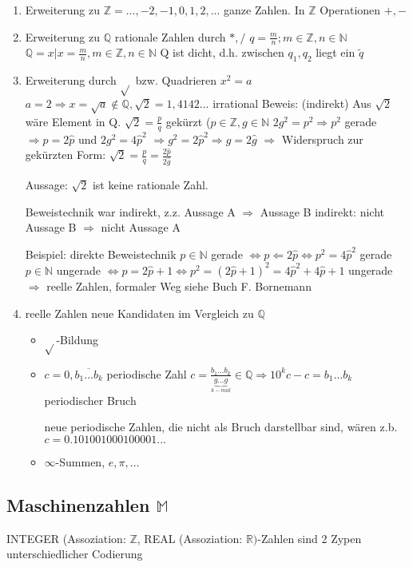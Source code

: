\documentclass[a4paper,10pt]{book}
\begin{document}
\begin{enumerate}
 \item Erweiterung zu $\mathbb{Z} = {...,-2,-1,0,1,2,...}$ ganze Zahlen. In $\mathbb{Z}$ Operationen $+,-$
 \item Erweiterung zu $\mathbb{Q}$ rationale Zahlen durch $*,/$ $q=\frac{m}{n}; m \in \mathbb{Z}, n \in \mathbb{N}$
$\mathbb{Q} = {x | x=\frac{m}{n}, m \in \mathbb{Z}, n \in \mathbb{N}}$
Q ist dicht, d.h. zwischen $q_1, q_2$ liegt ein $\tilde{q}$
 \item Erweiterung durch $\sqrt{}$ bzw. Quadrieren $x^2=a$
$a=2 \Rightarrow x = \sqrt{a} \notin \mathbb{Q}, \sqrt{2}=1,4142...$ irrational
Beweis: (indirekt)
Aus $\sqrt{2}$ wäre Element in Q. $\sqrt{2}=\frac{p}{q}$ gekürzt ($p \in \mathbb{Z}, g \in \mathbb{N}$
$2g^2=p^2 \Rightarrow p^2$ gerade $\Rightarrow p=2\hat{p}$ und $2g^2=4\hat{p}^2$
$\Rightarrow g^2 = 2\hat{p}^2 \Rightarrow g=2\hat{g}$ 
$\Rightarrow$ Widerspruch zur gekürzten Form: $\sqrt{2}=\frac{p}{q}=\frac{2\hat{p}}{2\hat{g}}$

Aussage: $\sqrt{2}$ ist keine rationale Zahl.

Beweistechnik war indirekt, z.z. Aussage A $\Rightarrow$ Aussage B
indirekt: nicht Aussage B $\Rightarrow$ nicht Aussage A

Beispiel: direkte Beweistechnik
$p \in \mathbb{N}$ gerade $\Leftrightarrow p \Leftarrow 2 \hat{p} \Leftrightarrow p^2 = 4\hat{p}^2$ gerade
$p \in \mathbb{N}$ ungerade $\Leftrightarrow p = 2 \hat{p}+1 \Leftrightarrow p^2 = (2\hat{p}+1)^2=4\hat{p}^2+4\hat{p}+1$ ungerade
$\Rightarrow$ reelle Zahlen, formaler Weg siehe Buch F. Bornemann

 \item reelle Zahlen
  neue Kandidaten im Vergleich zu $\mathbb{Q}$
\begin{itemize}
 \item $\sqrt{}$-Bildung
 \item $c = 0,\overline{b_1...b_k}$ periodische Zahl
$c = \frac{b_1...b_k}{\underbrace{g...g}_{k-mal}} \in \mathbb{Q} \Rightarrow 10^k c -c = b_1 \ldots b_k$ periodischer Bruch

neue periodische Zahlen, die nicht als Bruch darstellbar sind, wären z.b. $c=0.101001000100001...$
 \item $\infty$-Summen, $e, \pi,\ldots$
\end{itemize}

\end{enumerate}

\subsection{Maschinenzahlen $\mathbb{M}$}
INTEGER (Assoziation: $\mathbb{Z}$, REAL (Assoziation: $\mathbb{R})$-Zahlen sind 2 Zypen unterschiedlicher Codierung
\end{document}
